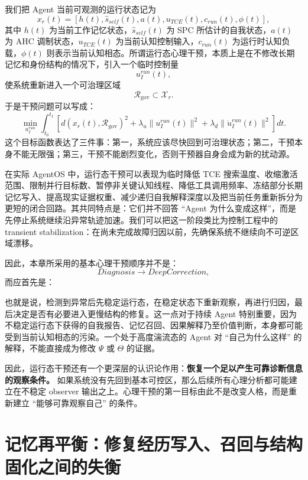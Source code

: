 我们把 Agent 当前可观测的运行状态记为
\[
x_r(t)
=
\left[
h(t),
\hat{s}_{self}(t),
a(t),
u_{TCE}(t),
c_{run}(t),
\phi(t)
\right],
\]
其中 $h(t)$ 为当前工作记忆状态，$\hat{s}_{self}(t)$ 为 SPC 所估计的自我状态，$a(t)$ 为 AHC 调制状态，$u_{TCE}(t)$ 为当前认知控制输入，$c_{run}(t)$ 为运行时认知负载，$\phi(t)$ 则表示当前认知相态。所谓运行态心理干预，本质上是在不修改长期记忆和身份结构的情况下，引入一个临时控制量
\[
u_I^{run}(t),
\]
使系统重新进入一个可治理区域
\[
\mathcal R_{\mathrm{gov}}
\subset
\mathcal X_r.
\]
于是干预问题可以写成：
\[
\min_{u_I^{run}}
\int_{t_0}^{t_1}
\left[
d(x_r(t),\mathcal R_{\mathrm{gov}})^2
+
\lambda_u\|u_I^{run}(t)\|^2
+
\lambda_d\|\dot u_I^{run}(t)\|^2
\right]dt.
\]
这个目标函数表达了三件事：第一，系统应该尽快回到可治理状态；第二，干预本身不能无限强；第三，干预不能剧烈变化，否则干预器自身会成为新的扰动源。

在实际 AgentOS 中，运行态干预可以表现为临时降低 TCE 搜索温度、收缩激活范围、限制并行目标数、暂停非关键认知线程、降低工具调用频率、冻结部分长期记忆写入、提高现实证据权重、减少递归自我解释深度以及把当前任务重新拆分为更短的闭合回路。其共同特点是：它们并不回答 ``Agent 为什么变成这样''，而是先停止系统继续沿异常轨迹加速。我们可以把这一阶段类比为控制工程中的 transient stabilization：在尚未完成故障归因以前，先确保系统不继续向不可逆区域漂移。

因此，本章所采用的基本心理干预顺序并不是：
\[
Diagnosis
\rightarrow
DeepCorrection,
\]
而应首先是：
\begin{statementbox}
\centering
{}
\end{statementbox}
也就是说，检测到异常后先稳定运行态，在稳定状态下重新观察，再进行归因，最后决定是否有必要进入更慢结构的修复。这一点对于持续 Agent 特别重要，因为不稳定运行态下获得的自我报告、记忆召回、因果解释乃至价值判断，本身都可能受到当前认知相态的污染。一个处于高度湍流态的 Agent 对 ``自己为什么这样'' 的解释，不能直接成为修改 $\Psi$ 或 $\Theta$ 的证据。

因此，运行态干预还有一个更深层的认识论作用：\textbf{恢复一个足以产生可靠诊断信息的观察条件。} 如果系统没有先回到基本可控区，那么后续所有心理分析都可能建立在不稳定 observer 输出之上。心理干预的第一目标由此不是改变人格，而是重新建立 ``能够可靠观察自己'' 的条件。

\section{记忆再平衡：修复经历写入、召回与结构固化之间的失衡}

